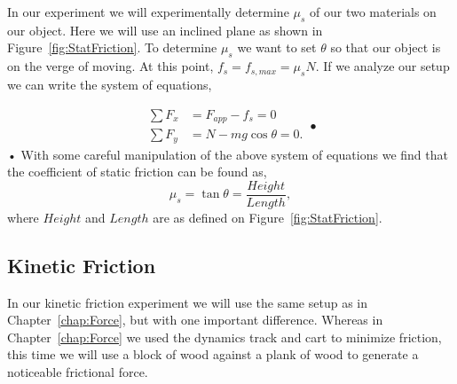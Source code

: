 \documentclass[main.tex]{subfiles}
\begin{document}
In our experiment we will experimentally determine $\mu_s$ of our two materials on our object. Here we will use an inclined plane as shown in Figure~\ref{fig:StatFriction}. To determine $\mu_s$ we want to set $\theta$ so that our object is on the verge of moving. At this point, $f_s=f_{s,max}=\mu_s N.$ If we analyze our setup we can write the system of equations,

\begin{subequations}
\begin{align}
\sum F_x &=F_{app}-f_s=0 \\
\sum F_y &=N-mg\cos\theta=0.
\end{align}•
\end{subequations}•
With some careful manipulation of the above system of equations we find that the coefficient of static friction can be found as,
\begin{equation}\label{eq:mus}
\mu_s=\tan\theta=\frac{Height}{Length},
\end{equation}
where $Height$ and $Length$ are as defined on Figure~\ref{fig:StatFriction}.

\subsection*{Kinetic Friction}
In our kinetic friction experiment we will use the same setup as in Chapter~\ref{chap:Force}, but with one important difference. Whereas in Chapter~\ref{chap:Force} we used the dynamics track and cart to minimize friction, this time we will use a block of wood against a plank of wood to generate a noticeable frictional force.
\end{document}
